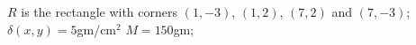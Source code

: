 {$R$ is the rectangle with corners $(1,-3)$, $(1,2)$, $(7,2)$ and $(7,-3)$; $\delta(x,y) = 5$gm/cm$^2$
\label{13_04_ex_11}
}
{$M = 150$gm;  %
}
